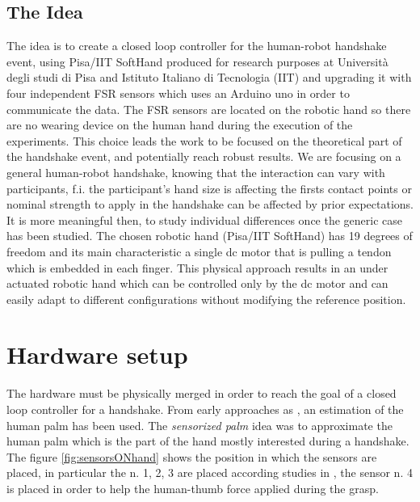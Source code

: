 \cite{facialexpressions}
\cite{mirrorgame}
\cite{papageorgiou}

\section{The Idea}
The idea is to create a closed loop controller for the human-robot handshake event, using Pisa/IIT SoftHand produced for research purposes at Universit\`a degli studi di Pisa and Istituto Italiano di Tecnologia (IIT) and upgrading it with four independent FSR sensors which uses an Arduino uno in order to communicate the data.
The FSR sensors are located on the robotic hand so there are no wearing device on the human hand during the execution of the experiments.
This choice leads the work to be focused on the theoretical part of the handshake event, and potentially reach robust results. We are focusing on a general human-robot handshake, knowing that the interaction can vary with participants, f.i. the participant's hand size is affecting the firsts contact points or nominal strength to apply in the handshake can be affected by prior expectations. It is more meaningful then, to study individual differences once the generic case has been studied.
The chosen robotic hand (Pisa/IIT SoftHand) has 19 degrees of freedom and its main characteristic a single dc motor that is pulling a tendon which is embedded in each finger. This physical approach results in an under actuated robotic hand which can be controlled only by the dc motor and can easily adapt to different configurations without modifying the reference position. 

\chapter{Hardware setup}
The hardware must be physically merged in order to reach the goal of a closed loop controller for a handshake. From early approaches as \cite{espen}, an estimation of the human palm has been used.  The \textit{sensorized palm} idea was to approximate the human palm which is the part of the hand mostly interested during a handshake.
The figure \ref{fig:sensorsONhand} shows the position in which the sensors are placed, in particular the n. 1, 2, 3 are placed according studies in \cite{espen}, the sensor n. 4 is placed in order to help the human-thumb force applied during the grasp.\\ \\

